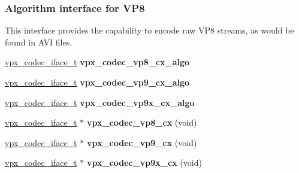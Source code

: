 \subsubsection*{Algorithm interface for V\+P8}
\label{_amgrp0b829b38ff2e659173b35cd78e0735bd}%
This interface provides the capability to encode raw V\+P8 streams, as would be found in A\+V\+I files. \begin{DoxyCompactItemize}
\item 
\hypertarget{group__vp8__encoder_ga689ede372ab835c8e1c9631f17b47eb5}{\hyperlink{group__codec_gae99c3b04f4a567a311211cce3ae6b83b}{vpx\+\_\+codec\+\_\+iface\+\_\+t} {\bfseries vpx\+\_\+codec\+\_\+vp8\+\_\+cx\+\_\+algo}}\label{group__vp8__encoder_ga689ede372ab835c8e1c9631f17b47eb5}

\item 
\hypertarget{group__vp8__encoder_ga2d01224b7a5b2a1ecf538493b3089d0f}{\hyperlink{group__codec_gae99c3b04f4a567a311211cce3ae6b83b}{vpx\+\_\+codec\+\_\+iface\+\_\+t} {\bfseries vpx\+\_\+codec\+\_\+vp9\+\_\+cx\+\_\+algo}}\label{group__vp8__encoder_ga2d01224b7a5b2a1ecf538493b3089d0f}

\item 
\hypertarget{group__vp8__encoder_gaa9e851e4d1535df1ab7451122ae90688}{\hyperlink{group__codec_gae99c3b04f4a567a311211cce3ae6b83b}{vpx\+\_\+codec\+\_\+iface\+\_\+t} {\bfseries vpx\+\_\+codec\+\_\+vp9x\+\_\+cx\+\_\+algo}}\label{group__vp8__encoder_gaa9e851e4d1535df1ab7451122ae90688}

\item 
\hypertarget{group__vp8__encoder_ga1b5362d0d5b5a2d50f173f9c160fad9f}{\hyperlink{group__codec_gae99c3b04f4a567a311211cce3ae6b83b}{vpx\+\_\+codec\+\_\+iface\+\_\+t} $\ast$ {\bfseries vpx\+\_\+codec\+\_\+vp8\+\_\+cx} (void)}\label{group__vp8__encoder_ga1b5362d0d5b5a2d50f173f9c160fad9f}

\item 
\hypertarget{group__vp8__encoder_ga3fdeb42af524ef0f07695aab8d95ae2c}{\hyperlink{group__codec_gae99c3b04f4a567a311211cce3ae6b83b}{vpx\+\_\+codec\+\_\+iface\+\_\+t} $\ast$ {\bfseries vpx\+\_\+codec\+\_\+vp9\+\_\+cx} (void)}\label{group__vp8__encoder_ga3fdeb42af524ef0f07695aab8d95ae2c}

\item 
\hypertarget{group__vp8__encoder_ga68279a080de517a6eb28e97b2602d632}{\hyperlink{group__codec_gae99c3b04f4a567a311211cce3ae6b83b}{vpx\+\_\+codec\+\_\+iface\+\_\+t} $\ast$ {\bfseries vpx\+\_\+codec\+\_\+vp9x\+\_\+cx} (void)}\label{group__vp8__encoder_ga68279a080de517a6eb28e97b2602d632}

\end{DoxyCompactItemize}


